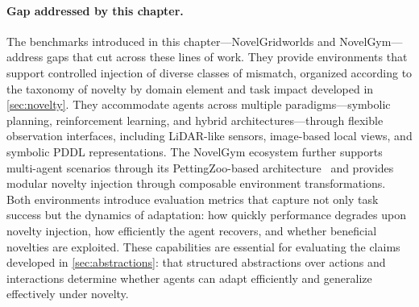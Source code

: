 \paragraph{Gap addressed by this chapter.}
The benchmarks introduced in this chapter---NovelGridworlds and NovelGym---address gaps that cut across these lines of work. They provide environments that support controlled injection of diverse classes of mismatch, organized according to the taxonomy of novelty by domain element and task impact developed in \cref{sec:novelty}. They accommodate agents across multiple paradigms---symbolic planning, reinforcement learning, and hybrid architectures---through flexible observation interfaces, including LiDAR-like sensors, image-based local views, and symbolic PDDL representations. The NovelGym ecosystem further supports multi-agent scenarios through its PettingZoo-based architecture~\citep{terry2021pettingzoo} and provides modular novelty injection through composable environment transformations. Both environments introduce evaluation metrics that capture not only task success but the dynamics of adaptation: how quickly performance degrades upon novelty injection, how efficiently the agent recovers, and whether beneficial novelties are exploited. These capabilities are essential for evaluating the claims developed in \cref{sec:abstractions}: that structured abstractions over actions and interactions determine whether agents can adapt efficiently and generalize effectively under novelty.